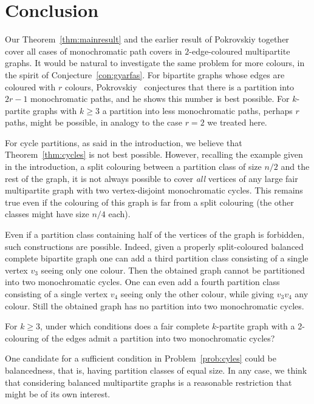 \documentclass[a4paper,10pt]{article}
\begin{document}
\section{Conclusion}\label{sec:conclu}

Our Theorem~\ref{thm:mainresult} and the earlier result of Pokrovskiy together cover all cases of monochromatic path covers in $2$-edge-coloured multipartite graphs. 
It would be natural to investigate the same problem for more colours, in the spirit of Conjecture~\ref{con:gyarfas}. 
For bipartite graphs whose edges are coloured with $r$ colours, Pokrovskiy~\cite{Pok14} conjectures that there is a partition into $2r-1$ monochromatic paths, and he shows this number is best possible. 
For $k$-partite graphs with $k\geq 3$ a partition into less monochromatic paths, perhaps $r$ paths, might be possible, in analogy to the case $r=2$ we treated here.

\medskip

For cycle partitions, as said in the introduction, we believe that Theorem~\ref{thm:cycles} is not best possible. 
However, recalling the example given in the introduction, a split colouring between a partition class of size $n/2$ and the rest of the graph,
it is not always possible to cover {\it all} vertices of any large fair multipartite graph with two vertex-disjoint monochromatic cycles.
This remains true even if the colouring of this graph is far from a split colouring (the other classes might have size $n/4$ each). 

Even if a partition class containing half of the vertices of the graph is forbidden, such constructions are possible.
Indeed, given a properly split-coloured balanced complete bipartite graph one can add a third partition class consisting of a single vertex $v_3$ seeing only one colour. Then the obtained graph cannot be partitioned into two monochromatic cycles. One can even add a fourth partition class consisting of a single vertex $v_4$ seeing only the other colour, while giving $v_3v_4$ any colour. Still the obtained graph has no partition into two monochromatic cycles.

\begin{problem}\label{prob:cyles}
For $k\geq 3$, under which conditions does a fair complete $k$-partite graph with a 2-colouring of the edges admit a partition into two monochromatic cycles?
\end{problem}

One candidate for a sufficient condition in Problem~\ref{prob:cyles} could be balancedness, that is, having partition classes of equal size.
In any case, we think that considering balanced multipartite graphs is a reasonable restriction that might be of its own interest.
\end{document}

